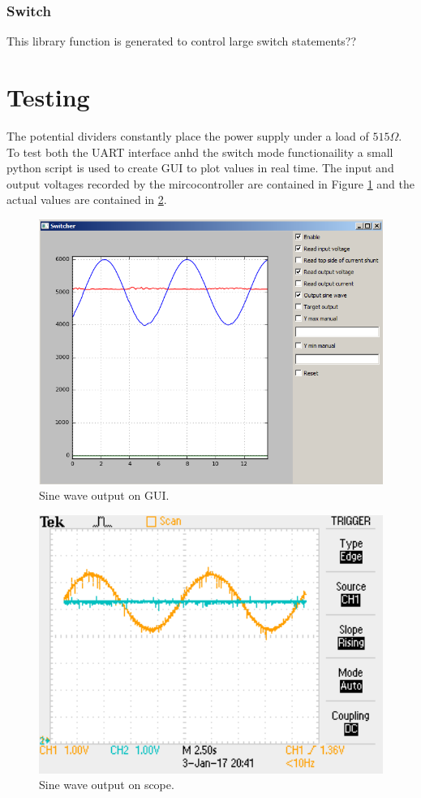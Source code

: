 \documentclass[12pt]{article}%
\begin{document}
\subsubsection{Switch}

This library function is generated to control large switch statements??


\section{Testing}

The potential dividers constantly place the power supply under a load of $515\Omega$. To test both the UART interface anhd the switch mode functionaility a small python script is used to create GUI to plot values in real time. The input and output voltages recorded by the mircocontroller are contained in Figure \ref{fig:gui} and the actual values are contained in \ref{fig:scope}.

\begin{figure}[H]
	\centering
  	\includegraphics[width=12cm]{gui.png}
  	\caption{Sine wave output on GUI.}
  	\label{fig:gui}
\end{figure}

\begin{figure}[H]
	\centering
  	\includegraphics[width=12cm]{scope.png}
  	\caption{Sine wave output on scope.}
  	\label{fig:scope}
\end{figure}
\end{document}
